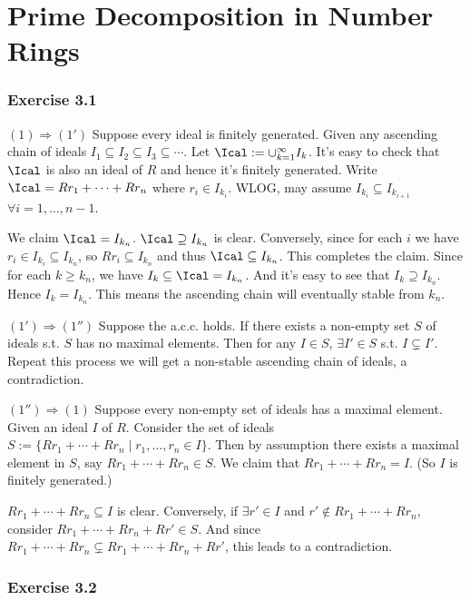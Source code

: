 \documentclass[../Chapter.tex]{subfiles}
\begin{document}
\chapter{Prime Decomposition in Number Rings}

\subsection*{Exercise 3.1}

$(1)\Rightarrow(1')$ Suppose every ideal is finitely generated. Given any ascending chain of ideals $I_1\subseteq I_2\subseteq I_3\subseteq\cdots$. Let $\Ical:=\cup_{k=1}^\infty I_k$. It's easy to check that $\Ical$ is also an ideal of $R$ and hence it's finitely generated. Write $\Ical=Rr_1+\cdots+Rr_n$ where $r_i\in I_{k_i}$. WLOG, may assume $I_{k_i}\subseteq I_{k_{i+1}}$ $\forall i=1,\ldots,n-1$. 

We claim $\Ical=I_{k_n}$. $\Ical\supseteq I_{k_n}$ is clear. Conversely, since for each $i$ we have $r_i\in I_{k_i}\subseteq I_{k_n}$, so $Rr_i\subseteq I_{k_n}$ and thus $\Ical\subseteq I_{k_n}$. This completes the claim. Since for each $k\geq k_n$, we have $I_k\subseteq \Ical=I_{k_n}$. And it's easy to see that $I_k\supseteq I_{k_n}$. Hence $I_k=I_{k_n}$. This means the ascending chain will eventually stable from $k_n$.

$(1')\Rightarrow(1'')$ Suppose the a.c.c. holds. If there exists a non-empty set $S$ of ideals s.t. $S$ has no maximal elements. Then for any $I\in S$, $\exists I'\in S$ s.t. $I\varsubsetneq I'$. Repeat this process we will get a non-stable ascending chain of ideals, a contradiction.

$(1'')\Rightarrow(1)$ Suppose every non-empty set of ideals has a maximal element. Given an ideal $I$ of $R$. Consider the set of ideals $S:=\{Rr_1+\cdots+Rr_n\mid r_1,\ldots,r_n\in I\}$. Then by assumption there exists a maximal element in $S$, say $Rr_1+\cdots+Rr_n \in S$. We claim that $Rr_1+\cdots+Rr_n=I$. (So $I$ is finitely generated.)

$Rr_1+\cdots+Rr_n\subseteq I$ is clear. Conversely, if $\exists r'\in I$ and $r'\notin Rr_1+\cdots+Rr_n$, consider $Rr_1+\cdots+Rr_n+Rr' \in S$. And since $Rr_1+\cdots+Rr_n \varsubsetneq Rr_1+\cdots+Rr_n+Rr'$, this leads to a contradiction.

\subsection*{Exercise 3.2}
\end{document}
